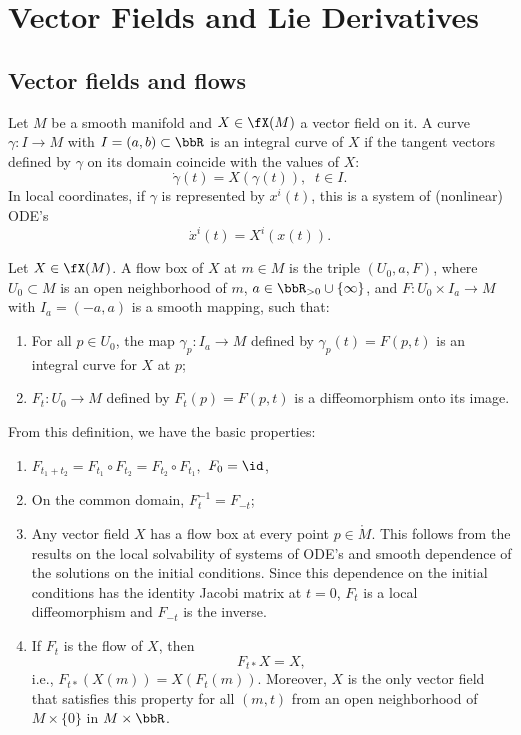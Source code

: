 \clearpage
\chapter{Vector Fields and Lie Derivatives}


\section{Vector fields and flows}


\begin{defn}
Let $M$ be a smooth manifold and $X\in\fX(M)$ a vector field on it. A curve $\gamma:I\to M$ with $I=(a,b)\subset\bbR $ is an integral curve of $X$ if the tangent vectors defined by $\gamma$ on its domain coincide with the values of $X$: 
\[
\dot\gamma(t)=X(\gamma(t)),\;\;t\in I.
\]
In local coordinates, if $\gamma$ is represented by $x^i(t)$, this is a system of (nonlinear) ODE's
\[
\dot x^i(t)=X^i(x(t)).
\]
\end{defn}
\begin{defn}
Let $X\in\fX(M)$. A flow box of $X$ at $m\in M$ is the triple $(U_0,a,F)$, where $U_0\subset M$ is an open neighborhood of $m$, $a\in \bbR_{>0}\cup\{\infty\}$, and $F:U_0\times I_a\to M$ with $I_a=(-a,a)$ is a smooth mapping, such that:
\begin{enumerate}
    \item For all $p\in U_0$, the map $\gamma_p:I_a\to M$ defined by $\gamma_p(t)=F(p,t)$ is an integral curve for $X$ at $p$;
    \item $F_t:U_0\to M$ defined by $F_t(p)=F(p,t)$ is a diffeomorphism onto its image.
\end{enumerate}
\end{defn}
From this definition, we have the basic properties:
\begin{enumerate}
    \item $F_{t_1+t_2}=F_{t_1}\circ F_{t_2}=F_{t_2}\circ F_{t_1},$ $F_0=\id$,
    \item On the common domain, $F_t^{-1}=F_{-t}$;
    \item Any vector field $X$ has a flow box at every point $p\in \mathring{M}$. This follows from the results on the local solvability of systems of ODE's and smooth dependence of the solutions on the initial conditions. Since this dependence on the initial conditions has the identity Jacobi matrix at $t=0$, $F_t$ is a local diffeomorphism and $F_{-t}$ is the inverse.
    \item If $F_t$ is the flow of $X$, then \[F_{t\ast}X=X,\] i.e., $F_{t\ast}(X(m))=X(F_t(m))$. Moreover, $X$ is the only vector field that satisfies this property for all $(m,t)$ from an open neighborhood of $M\times\{0\}$ in $M\times\bbR $.
\end{enumerate}

